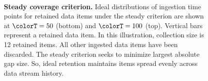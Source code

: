 \begin{figure}
\begin{minipage}[t]{0.4\textwidth}
    \begin{minipage}[]{\textwidth}
    \noindent{}%
    \hspace{-1.5ex}%
    {\vrule width 1pt}%
    \noindent{}%
    \end{minipage}
\end{minipage}%
\begin{minipage}[t]{0.05\textwidth}
~
\end{minipage}%
\begin{minipage}[t]{0.4\textwidth}
    \vspace{-7ex}%
    \caption{%
      \textbf{Steady coverage criterion.}
      \footnotesize
      Ideal distributions of ingestion time points for retained data items under the steady criterion are shown at $\colorT=50$ (bottom) and $\colorT=100$ (top).
      Vertical bars represent a retained data item.
      In this illustration, collection size is 12 retained items.
      All other ingested data items have been discarded.
      The steady criterion seeks to minimize largest absolute gap size.
      So, ideal retention maintains items spread evenly across data stream history.
      }
    \label{fig:criteria-intuition}
\end{minipage}
\end{figure}
